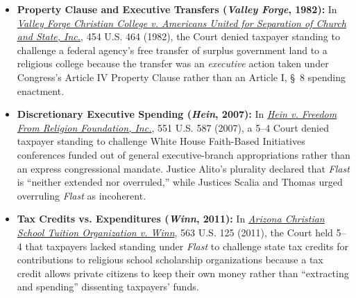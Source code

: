 \documentclass[12pt]{article}
\begin{document}
\begin{itemize}

\item \textbf{Property Clause and Executive Transfers (\textit{Valley Forge}, 1982):} In \href{https://supreme.justia.com/cases/federal/us/454/464/}{\textit{Valley Forge Christian College v. Americans United for Separation of Church and State, Inc.}}, 454 U.S. 464 (1982), the Court denied taxpayer standing to challenge a federal agency's free transfer of surplus government land to a religious college because the transfer was an \textit{executive} action taken under Congress's Article IV Property Clause rather than an Article I, \S\ 8 spending enactment.
  \item \textbf{Discretionary Executive Spending (\textit{Hein}, 2007):} In \href{https://supreme.justia.com/cases/federal/us/551/587/}{\textit{Hein v. Freedom From Religion Foundation, Inc.}}, 551 U.S. 587 (2007), a 5--4 Court denied taxpayer standing to challenge White House Faith-Based Initiatives conferences funded out of general executive-branch appropriations rather than an express congressional mandate. Justice Alito's plurality declared that \textit{Flast} is ``neither extended nor overruled,'' while Justices Scalia and Thomas urged overruling \textit{Flast} as incoherent.
  \item \textbf{Tax Credits vs. Expenditures (\textit{Winn}, 2011):} In \href{https://supreme.justia.com/cases/federal/us/563/125/}{\textit{Arizona Christian School Tuition Organization v. Winn}}, 563 U.S. 125 (2011), the Court held 5--4 that taxpayers lacked standing under \textit{Flast} to challenge state tax credits for contributions to religious school scholarship organizations because a tax credit allows private citizens to keep their own money rather than ``extracting and spending'' dissenting taxpayers' funds.

\end{itemize}
\end{document}
